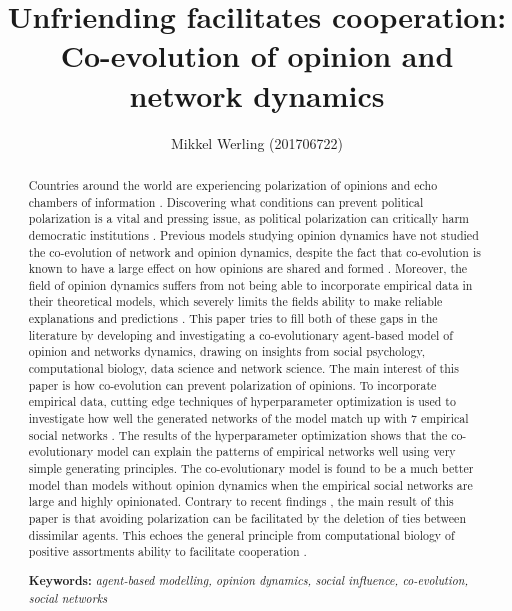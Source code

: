 \documentclass{article}
\title{Unfriending facilitates cooperation: \\Co-evolution of opinion and network dynamics}
\author{Mikkel Werling (201706722)}
\date{}
\begin{document}
\maketitle
\begin{abstract}
  \noindent Countries around the world are experiencing polarization of opinions and echo chambers of information \cite{del_vicario_echo_2016,tsai_echo_2020,sasahara_social_2021}. 
  Discovering what conditions can prevent political polarization is a vital and pressing issue, as political polarization can critically harm democratic institutions \cite{boxell_cross-country_2020}.
  Previous models studying opinion dynamics have not studied the co-evolution of network and opinion dynamics, despite the fact that co-evolution is known to have a large effect on how opinions are shared and formed \cite{flache_models_2017,galesic_integrating_2021,mcpherson_birds_2001}.
  Moreover, the field of opinion dynamics suffers from not being able to incorporate empirical data in their theoretical models, which severely limits the fields ability to make reliable explanations and predictions \cite{flache_models_2017,galesic_integrating_2021, mas2019challenges}.
  This paper tries to fill both of these gaps in the literature by developing and investigating a co-evolutionary agent-based model of opinion and networks dynamics, drawing on insights from social psychology, computational biology, data science and network science. The main interest of this paper is how co-evolution can prevent polarization of opinions. To incorporate empirical data, cutting edge techniques of hyperparameter optimization is used to investigate how well the generated networks of the model match up with 7 empirical social networks \cite{krivorotko2022agent,akiba_optuna_2019}. 
  The results of the hyperparameter optimization shows that the co-evolutionary model can explain the patterns of empirical networks well using very simple generating principles. The co-evolutionary model is found to be a much better model than models without opinion dynamics when the empirical social networks are large and highly opinionated. 
  Contrary to recent findings \cite{sasahara_social_2021}, the main result of this paper is that avoiding polarization can be facilitated by the deletion of ties between dissimilar agents. This echoes the general principle from computational biology of positive assortments ability to facilitate cooperation \cite{pepper_mechanism_2002, dakin_dynamic_2018,santos_cooperation_2006}.
  
  \noindent \textbf{Keywords:} \textit{agent-based modelling, opinion dynamics, social influence, co-evolution, social networks}
\end{abstract}
\end{document}
